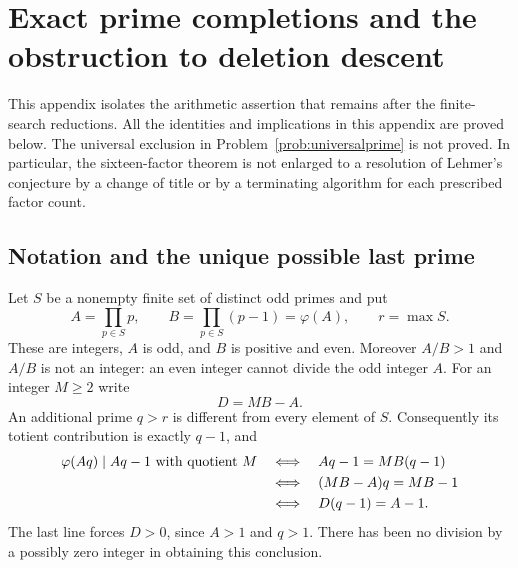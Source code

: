 \section{Exact prime completions and the obstruction to deletion descent}
\label{app:finalprimeaudit}

This appendix isolates the arithmetic assertion that remains after the
finite-search reductions. All the identities and implications in this
appendix are proved below. The universal exclusion in
Problem~\ref{prob:universalprime} is not proved. In particular, the
sixteen-factor theorem is not enlarged to a resolution of Lehmer's
conjecture by a change of title or by a terminating algorithm for each
prescribed factor count.

\subsection{Notation and the unique possible last prime}
Let $S$ be a nonempty finite set of distinct odd primes and put
\begin{equation}\label{eq:auditprefix}
 A=\prod_{p\in S}p,\qquad B=\prod_{p\in S}(p-1)=\varphi(A),
 \qquad r=\max S.
\end{equation}
These are integers, $A$ is odd, and $B$ is positive and even. Moreover
$A/B>1$ and $A/B$ is not an integer: an even integer cannot divide the
odd integer $A$. For an integer $M\ge2$ write
\begin{equation}\label{eq:auditdefect}
 D=MB-A.
\end{equation}
An additional prime $q>r$ is different from every element of $S$.
Consequently its totient contribution is exactly $q-1$, and
\begin{align}
 \varphi(Aq)\mid Aq-1\text{ with quotient }M
 &\quad\Longleftrightarrow\quad Aq-1=MB(q-1)\notag\\
 &\quad\Longleftrightarrow\quad (MB-A)q=MB-1\notag\\
 &\quad\Longleftrightarrow\quad D(q-1)=A-1.
 \label{eq:auditidentity}
\end{align}
The last line forces $D>0$, since $A>1$ and $q>1$.
There has been no division by a possibly zero integer in obtaining this
conclusion.

